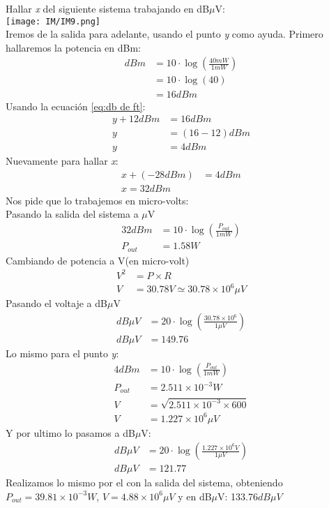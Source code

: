 \documentclass[
	11pt, %
	fleqn, %
	a4paper, %
]{LegrandOrangeBook}
\begin{document}
\begin{example}
Hallar \textit{x} del siguiente sistema trabajando en dB$\mu$V:\\
\texttt{[image: IM/IM9.png]}\\
Iremos de la salida para adelante, usando el punto \textit{y} como ayuda. Primero hallaremos la potencia en dBm:
\begin{align*}
dBm&=10\cdot\log\left(\frac{40mW}{1mW}\right)\\
&=10\cdot\log\left(40\right)\\
&=16dBm
\end{align*}
Usando la ecuación \ref{eq:db de ft}:
\begin{align*}
y+12dBm&=16dBm\\
y&=(16-12)dBm\\
y&=4dBm
\end{align*}
Nuevamente para hallar \textit{x}:
\begin{align*}
x+(-28dBm)&=4dBm\\
x=32dBm
\end{align*}
Nos pide que lo trabajemos en micro-volts:\\
Pasando la salida del sistema a $\mu$V
\begin{align*}
32dBm&=10\cdot\log\left(\frac{P_{out}}{1mW}\right)\\
P_{out}&=1.58W
\end{align*}
Cambiando de potencia a V(en micro-volt)
\begin{align*}
V^2&=P\times R\\
V&=30.78V\simeq 30.78\times 10^6\mu V	
\end{align*}
Pasando el voltaje a dB$\mu$V
\begin{align*}
dB\mu V&=20\cdot\log\left(\frac{30.78\times 10^6}{1\mu V}\right)\\
dB\mu V&=149.76
\end{align*}
Lo mismo para el punto \textit{y}:
\begin{align*}
4dBm&=10\cdot\log\left(\frac{P_{out}}{1mW}\right)\\
P_{out}&=2.511\times 10^{-3}W\\
V&=\sqrt{2.511\times 10^{-3}\times 600}\\
V&=1.227\times 10^6\mu V
\end{align*}
Y por ultimo lo pasamos a dB$\mu$V:
\begin{align*}
dB\mu V&=20\cdot\log\left(\frac{1.227\times 10^6V}{1\mu V}\right)\\
dB\mu V&=121.77
\end{align*}
Realizamos lo mismo por el con la salida del sistema, obteniendo $P_{out}=39.81\times 10^{-3}W$, $V=4.88\times 10^6\mu V$ y en dB$\mu$V: 133.76$dB\mu V$
\end{example}
\end{document}
